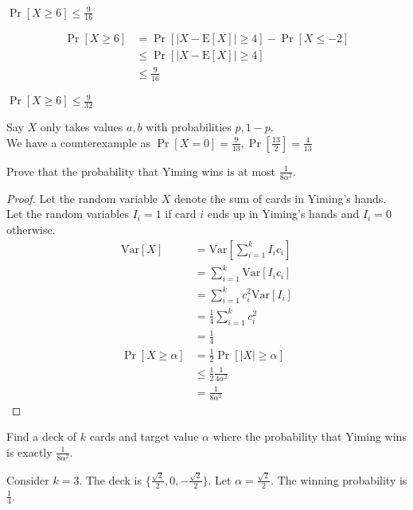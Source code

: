 \documentclass[11pt]{article}
\newcommand{\E}[0]{\mathrm{E}}
\newcommand{\Var}[0]{\mathrm{Var}}
\begin{document}
\begin{Parts}
    \Part $\Pr[X \geq 6] \leq \frac{9}{16}$
    \begin{Answer}
        \begin{align*}
            \Pr[X \geq 6] &= \Pr[|X - \E[X]| \geq 4] - \Pr[X \leq -2] \\
                          &\leq \Pr[|X - \E[X]| \geq 4] \\
                          &\leq \frac{9}{16}
        \end{align*}
    \end{Answer}

    \Part $\Pr[X \geq 6] \leq \frac{9}{32}$
    \begin{Answer}
        Say $X$ only takes values $a,b$ with probabilities $p,1-p$. \\
        We have a counterexample as $\Pr[X=0] = \frac{9}{13}, \Pr[\frac{13}{2}] = \frac{4}{13}$
    \end{Answer}

\end{Parts}

\newpage
{}

\begin{Parts}

    \Part Prove that the probability that Yiming wins is at most $\frac{1}{8\alpha^2}$. 

    \begin{Answer}
        \begin{proof}
            Let the random variable $X$ denote the sum of cards in Yiming's hands. \\
            Let the random variables $I_i=1$ if card $i$ ends up in Yiming's hands and $I_i = 0$ otherwise.  
            \begin{align*}
                \Var[X] &= \Var[\sum_{i=1}^k I_ic_i] \\
                        &= \sum_{i=1}^k \Var[I_ic_i] \\
                        &= \sum_{i=1}^k c_i^2 \Var[I_i] \\
                        &= \frac{1}{4} \sum_{i=1}^k c_i^2 \\
                        &= \frac{1}{4} \\
                \Pr[X \geq \alpha] &= \frac{1}{2} \Pr[|X| \geq \alpha] \\
                                   &\leq \frac{1}{2} \frac{1}{4\alpha^2} \\ 
                                   &= \frac{1}{8\alpha^2}
            \end{align*}
        \end{proof}
    \end{Answer}

    \Part Find a deck of $k$ cards and target value $\alpha$ where the probability that Yiming wins is exactly $\frac{1}{8\alpha^2}$.

    \begin{Answer}
        Consider $k=3$. The deck is $\{\frac{\sqrt{2}}{2},0,-\frac{\sqrt{2}}{2}\}$. Let $\alpha=\frac{\sqrt{2}}{2}$. The winning probability is $\frac{1}{4}$. 
    \end{Answer}

\end{Parts}
\end{document}
